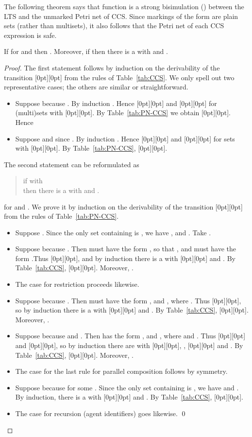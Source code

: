 \documentclass[smallcondensed]{svjour3}
\newcommand{\plat}[1]{\raisebox{0pt}[0pt][0pt]{#1}}  \def\precond#1{{\vphantom{#1}}^\bullet #1}
\newcommand{\Tab}[1]{Table~\ref{tab:#1}}
\begin{document}
The following theorem says that function  is a strong bisimulation (\cite{Mi89}) between the LTS and the unmarked
Petri net of CCS. Since markings of the form  are plain sets (rather than multisets), it also
follows that the Petri net of each CCS expression is safe.\begin{theorem}\rm\label{thm:bisimulation}
If  for  and  then .
Moreover, if  then there is a  with  and .
\end{theorem}
\begin{proof}
The first statement follows by induction on the derivability of the transition
\plat{} from the rules of \Tab{CCS}. We only spell out two representative cases;
the others are similar or straightforward.
\begin{itemize}
\item Suppose  because .
By induction .
Hence \plat{} and \plat{} for (multi)sets  with \plat{}.
By \Tab{PN-CCS} we obtain \plat{}. Hence

\item Suppose  and  since .
By induction . Hence  \plat{} and
\plat{} for sets  with \plat{}.
By \Tab{PN-CCS}, \plat{}.
\end{itemize}
The second statement can be reformulated as
\begin{quote}
if  with \\ then there is a  with  and .
\end{quote}
for  and .
We prove it by induction on the derivability of the transition \plat{} from the rules of \Tab{PN-CCS}.
\begin{itemize}
\item Suppose . Since the only set  containing
   is , we have ,  and .  Take .
\item Suppose  because .
  Then  must have the form , so that , and  must have the form .\linebreak[4]
  Thus \plat{}, and by induction there is a  with
  \plat{} and . By \Tab{CCS}, \plat{}.
  Moreover, .
\item The case for restriction proceeds likewise.
\item Suppose  because .
  Then  must have the form , and , where .
  Thus \plat{}, so by induction there is a  with
  \plat{} and .  By \Tab{CCS}, \plat{}.
  Moreover, .
\item Suppose  because  and .
  Then  has the form , and , where
   and .
  Thus \plat{} and \plat{}, so by induction
  there are  with \plat{}, ,
  \plat{} and .  By \Tab{CCS}, \plat{}.
  Moreover, .
\item The case for the last rule for parallel composition follows by symmetry.
\item Suppose  because 
  for some .
  Since the only set  containing  is ,
  we have  and .
  By induction, there is a  with \plat{}
  and .
  By \Tab{CCS}, \plat{}.
\item The case
  for recursion (agent identifiers) goes likewise.
\qed
\end{itemize}
\end{proof}
\end{document}
